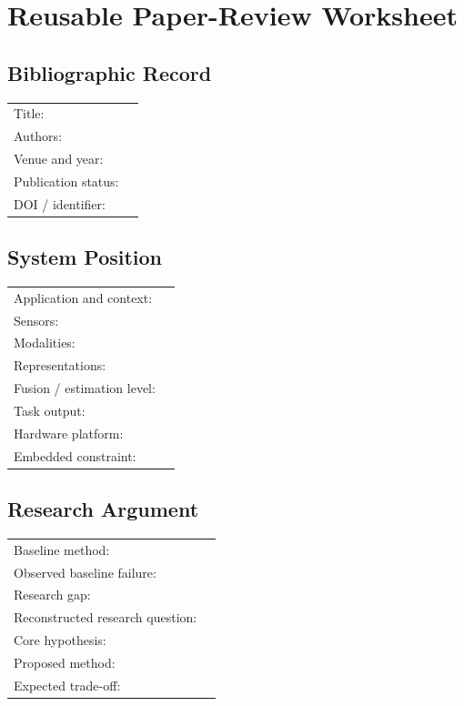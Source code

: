 \chapter{Reusable Paper-Review Worksheet}
\label{app:review-template}

\section*{Bibliographic Record}

\begin{tabularx}{\textwidth}{@{}p{4.0cm}X@{}}
Title: & \\
Authors: & \\
Venue and year: & \\
Publication status: & \\
DOI / identifier: & \\
\end{tabularx}

\section*{System Position}

\begin{tabularx}{\textwidth}{@{}p{4.0cm}X@{}}
Application and context: & \\
Sensors: & \\
Modalities: & \\
Representations: & \\
Fusion / estimation level: & \\
Task output: & \\
Hardware platform: & \\
Embedded constraint: & \\
\end{tabularx}

\section*{Research Argument}

\begin{tabularx}{\textwidth}{@{}p{4.0cm}X@{}}
Baseline method: & \\
Observed baseline failure: & \\
Research gap: & \\
Reconstructed research question: & \\
Core hypothesis: & \\
Proposed method: & \\
Expected trade-off: & \\
\end{tabularx}

